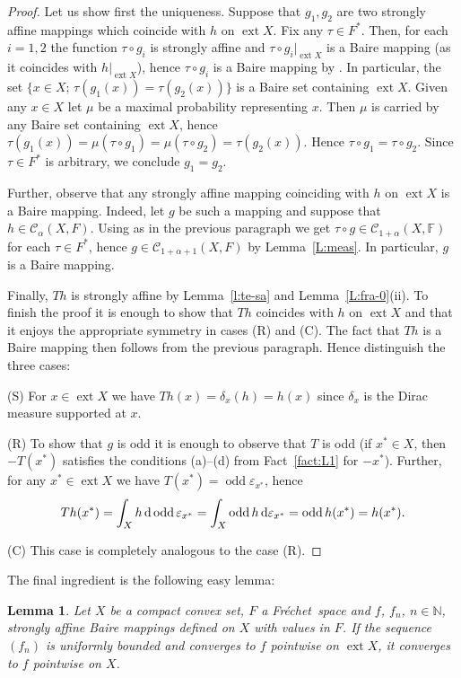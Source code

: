 \documentclass{amsart}
\numberwithin{equation}{section}
\newtheorem{lemma}[thm]{Lemma}
\theoremstyle{definition}
\def\C{\mathcal C}
\def\ep{\varepsilon}
\def\en{\mathbb N}
\def\ef{\mathbb F}
\def\r{|}
\def \ext {\operatorname{ext}}
\def\odd{\operatorname{odd}}
\def\di{\,\mbox{\rm d}}
\newcommand{\setsep}{;\,}
\newcommand{\fr}{Fr\'echet\ }
\begin{document}
\begin{proof} Let us show first the uniqueness. Suppose that $g_1,g_2$ are two strongly affine mappings which coincide with $h$ on $\ext X$. Fix any $\tau\in F^*$. Then, for each $i=1,2$ the function $\tau\circ g_i$ is strongly affine and $\tau\circ g_i\r_{\ext X}$ is a Baire mapping (as it coincides with $h\r_{\ext X}$), hence $\tau\circ g_i$ is a Baire mapping by \cite[Theorem 5.2]{lusp}. In particular, 
the set $\{x\in X\setsep \tau(g_1(x))=\tau(g_2(x))\}$ is a Baire set containing $\ext X$. Given any $x\in X$ let $\mu$ be a maximal probability representing $x$. Then $\mu$ is carried by any Baire set containing $\ext X$, hence
$\tau(g_1(x))=\mu(\tau\circ g_1)=\mu(\tau\circ g_2)=\tau(g_2(x))$. Hence $\tau\circ g_1=\tau\circ g_2$. Since $\tau\in F^*$ is arbitrary, we conclude $g_1=g_2$.

Further, observe that any strongly affine mapping coinciding with $h$ on $\ext X$ is a Baire mapping. Indeed, let $g$ be such a mapping and suppose that $h\in\C_\alpha(X,F)$. Using \cite[Theorem 5.2]{lusp} as in the previous paragraph we get $\tau\circ g\in\C_{1+\alpha}(X,\ef)$ for each $\tau\in F^*$, hence $g\in\C_{1+\alpha+1}(X,F)$ by Lemma~\ref{L:meas}. In particular, $g$ is a Baire mapping.

Finally, $Th$ is strongly affine by Lemma~\ref{l:te-sa} and Lemma~\ref{L:fra-0}(ii). To finish the proof it is enough to
show that $Th$ coincides with $h$ on $\ext X$ and that it enjoys the appropriate symmetry in cases (R) and (C). The fact that $Th$ is a Baire mapping then follows from the previous paragraph. Hence distinguish the three cases:

(S) For $x\in\ext X$ we have $Th(x)=\delta_x(h)=h(x)$ since $\delta_x$ is the Dirac measure supported at $x$.

(R) To show that $g$ is odd it is enough to observe that $T$ is odd (if $x^*\in X$, then $-T(x^*)$ satisfies the conditions (a)--(d) from Fact~\ref{fact:L1} for $-x^*$). Further, for any $x^*\in \ext X$ we have $T(x^*)=\odd\ep_{x^*}$, hence
$$Th(x^*)=\int_X h\di \odd\ep_{x^*}=\int_X\odd h\di\ep_{x^*}=\odd h(x^*)=h(x^*).$$
 
(C) This case is completely analogous to the case (R).
\end{proof}

 
The final ingredient is the following easy lemma:

\begin{lemma}\label{L:limita} Let $X$ be a compact convex set, $F$ a \fr space and $f$, $f_n$, $n\in\en$, strongly affine Baire mappings defined on $X$ with values in $F$. If the sequence $(f_n)$ is uniformly bounded and converges to $f$ pointwise on $\ext X$, it converges to $f$ pointwise on $X$.
\end{lemma}
\end{document}
